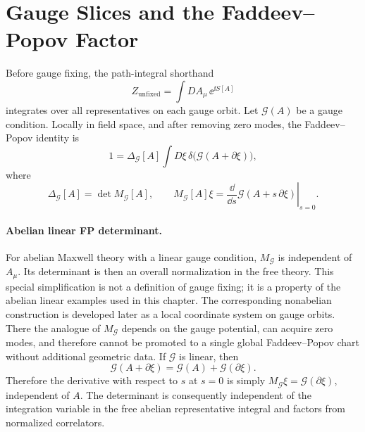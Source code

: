 \section{Gauge Slices and the Faddeev--Popov Factor}

\begin{definition}
\label{def:local-faddeev-popov-chart-maxwell}
Before gauge fixing, the path-integral shorthand
\[
  Z_{\mathrm{unfixed}}
  =
  \int DA_\mu\,\ee^{\ii S[A]}
\]
integrates over all representatives on each gauge orbit. Let
\(\mathcal G(A)\) be a gauge condition. Locally in field space, and after
removing zero modes, the Faddeev--Popov identity is
\[
  1
  =
  \Delta_{\mathcal G}[A]
  \int D\xi\,\delta\bigl(\mathcal G(A+\partial\xi)\bigr),
\]
where
\[
  \Delta_{\mathcal G}[A]
  =
  \det M_{\mathcal G}[A],
  \qquad
  M_{\mathcal G}[A]\xi
  =
  \left.
  \frac{\dd}{\dd s}
  \mathcal G(A+s\,\partial\xi)
  \right|_{s=0}.
\]
\end{definition}

\paragraph{Abelian linear FP determinant.}
For abelian Maxwell theory with a linear gauge condition, \(M_{\mathcal G}\)
is independent of \(A_\mu\). Its determinant is then an overall
normalization in the free theory. This special simplification is not a
definition of gauge fixing; it is a property of the abelian linear examples
used in this chapter. The corresponding nonabelian construction is developed
later as a local coordinate system on gauge orbits. There the analogue of
\(M_{\mathcal G}\) depends on the gauge potential, can acquire zero modes, and
therefore cannot be promoted to a single global Faddeev--Popov chart without
additional geometric data.
If \(\mathcal G\) is linear, then
\[
  \mathcal G(A+\partial\xi)=\mathcal G(A)+\mathcal G(\partial\xi).
\]
Therefore the derivative with respect to \(s\) at \(s=0\) is simply
\(M_{\mathcal G}\xi=\mathcal G(\partial\xi)\), independent of \(A\).  The
determinant is consequently independent of the integration variable in the
free abelian representative integral and factors from normalized correlators.

